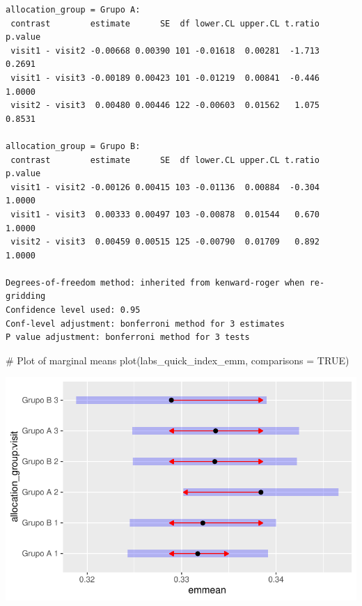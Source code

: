 \documentclass[
  letterpaper,
  DIV=11,
  numbers=noendperiod]{scrartcl}
\newenvironment{Shaded}{\begin{snugshade}}{\end{snugshade}}
\newcommand{\AttributeTok}[1]{\textcolor[rgb]{0.40,0.45,0.13}{#1}}
\newcommand{\CommentTok}[1]{\textcolor[rgb]{0.37,0.37,0.37}{#1}}
\newcommand{\ConstantTok}[1]{\textcolor[rgb]{0.56,0.35,0.01}{#1}}
\newcommand{\FunctionTok}[1]{\textcolor[rgb]{0.28,0.35,0.67}{#1}}
\newcommand{\NormalTok}[1]{\textcolor[rgb]{0.00,0.23,0.31}{#1}}
\begin{document}
\begin{verbatim}
allocation_group = Grupo A:
 contrast        estimate      SE  df lower.CL upper.CL t.ratio p.value
 visit1 - visit2 -0.00668 0.00390 101 -0.01618  0.00281  -1.713  0.2691
 visit1 - visit3 -0.00189 0.00423 101 -0.01219  0.00841  -0.446  1.0000
 visit2 - visit3  0.00480 0.00446 122 -0.00603  0.01562   1.075  0.8531

allocation_group = Grupo B:
 contrast        estimate      SE  df lower.CL upper.CL t.ratio p.value
 visit1 - visit2 -0.00126 0.00415 103 -0.01136  0.00884  -0.304  1.0000
 visit1 - visit3  0.00333 0.00497 103 -0.00878  0.01544   0.670  1.0000
 visit2 - visit3  0.00459 0.00515 125 -0.00790  0.01709   0.892  1.0000

Degrees-of-freedom method: inherited from kenward-roger when re-gridding 
Confidence level used: 0.95 
Conf-level adjustment: bonferroni method for 3 estimates 
P value adjustment: bonferroni method for 3 tests 
\end{verbatim}

\begin{Shaded}
\begin{Highlighting}[]
\CommentTok{\# Plot of marginal means}
\FunctionTok{plot}\NormalTok{(labs\_quick\_index\_emm, }\AttributeTok{comparisons =} \ConstantTok{TRUE}\NormalTok{)}
\end{Highlighting}
\end{Shaded}

\includegraphics{Outcomes_V1V2V3_files/figure-pdf/labs_quick_index_sens_emm-1.pdf}
\end{document}
